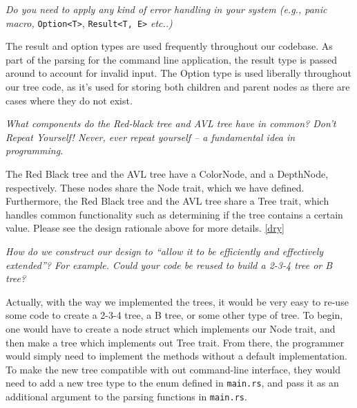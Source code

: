 \documentclass[letterpaper]{article}
\begin{document}
\textit{Do you need to apply any kind of error handling in your system (e.g.,
panic macro,}
\verb|Option<T>|, \verb|Result<T, E>| \textit{etc..)}

The result and option types are used frequently throughout our
codebase. As part of the parsing for the command line application, the
result type is passed around to account for invalid input. The Option
type is used liberally throughout our tree code, as it's used for
storing both children and parent nodes as there are cases where they
do not exist.

\textit{What components do the Red-black tree and AVL tree have in common? Don’t Repeat
Yourself! Never, ever repeat yourself – a fundamental idea in programming.}

The Red Black tree and the AVL tree have a ColorNode, and a DepthNode,
respectively. These nodes share the Node trait, which we have defined.
Furthermore, the Red Black tree and the AVL tree share a Tree trait, which
handles common functionality such as determining if the tree contains a certain
value.
Please see the design rationale above for more details. \ref{dry}

\textit{How do we construct our design to “allow it to be efficiently and
effectively extended”? For example. Could your code be reused to build a 2-3-4
tree or B tree?}

Actually, with the way we implemented the trees, it would be very easy to re-use
some code to create a 2-3-4 tree, a B tree, or some other type of tree. To
begin, one would have to create a node struct which implements our Node trait,
and then make a tree which implements out Tree trait. From there, the programmer
would simply need to implement the methods without a default implementation.
To make the new tree compatible with out command-line interface, they would need
to add a new tree type to the enum defined in \texttt{main.rs}, and pass it
as an additional argument to the parsing functions in \texttt{main.rs}.


\end{document}
